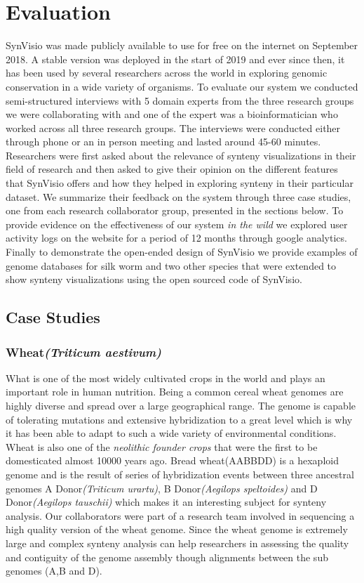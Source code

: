 \chapter{Evaluation}

SynVisio was made publicly available to use for free on the internet on September 2018. A stable version was deployed in the start of 2019 and ever since then, it has been used by several researchers across the world in exploring genomic conservation in a wide variety of organisms. To evaluate our system we conducted semi-structured interviews with 5 domain experts from the three research groups we were collaborating with and one of the expert was a bioinformatician who worked across all three research groups. The interviews were conducted either through phone or an in person meeting and lasted around 45-60 minutes. Researchers were first asked about the relevance of synteny visualizations in their field of research and then asked to give their opinion on the different features that SynVisio offers and how they helped in exploring synteny in their particular dataset. We summarize their feedback on the system through three case studies, one from each research collaborator group, presented in the sections below. To provide evidence on the effectiveness of our system \textit{in the wild} we explored user activity logs on the website for a period of 12 months through google analytics. Finally to demonstrate the open-ended design of SynVisio we provide examples of genome databases for silk worm and two other species that were extended to show synteny visualizations using the open sourced code of SynVisio.

\section{Case Studies}

\subsection{Wheat\textit{(Triticum aestivum)}}
What is one of the most widely cultivated crops in the world and plays an important role in human nutrition. Being a common cereal wheat genomes are highly diverse and spread over a large geographical range. The genome is capable of tolerating mutations and extensive hybridization to a great level which is why it has been able to adapt to such a wide variety of environmental conditions\cite{wheatinfo,10wheat}. Wheat is also one of the \textit{neolithic founder crops} that were the first to be domesticated almost 10000 years ago.
Bread wheat(AABBDD) is a hexaploid genome and is the result of series of hybridization events between three ancestral genomes A Donor\textit{(Triticum urartu)}, B Donor\textit{(Aegilops speltoides)} and D Donor\textit{(Aegilops tauschii)} which makes it an interesting subject for synteny analysis. Our collaborators were part of a research team involved in sequencing a high quality version of the wheat genome. Since the wheat genome is extremely large and complex synteny analysis can help researchers in assessing the quality and contiguity of the genome assembly though alignments between the sub genomes (A,B and D).

